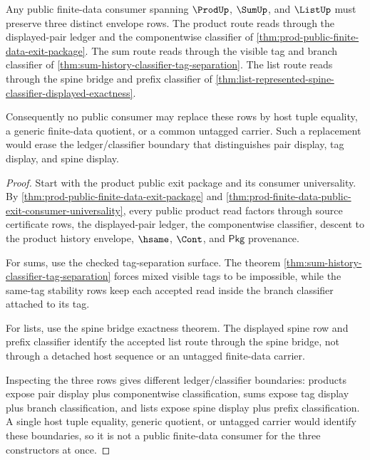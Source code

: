 \begin{theorem}
\label{thm:finite-data-product-sum-list-envelope-separation}
Any public finite-data consumer spanning $\ProdUp$, $\SumUp$, and $\ListUp$
must preserve three distinct envelope rows. The product route reads through the
displayed-pair ledger and the componentwise classifier of
\autoref{thm:prod-public-finite-data-exit-package}. The sum route reads through
the visible tag and branch classifier of
\autoref{thm:sum-history-classifier-tag-separation}. The list route reads
through the spine bridge and prefix classifier of
\autoref{thm:list-represented-spine-classifier-displayed-exactness}.

Consequently no public consumer may replace these rows by host tuple equality,
a generic finite-data quotient, or a common untagged carrier. Such a
replacement would erase the ledger/classifier boundary that distinguishes pair
display, tag display, and spine display.
\end{theorem}
\begin{proof}
Start with the product public exit package and its consumer universality. By
\autoref{thm:prod-public-finite-data-exit-package} and
\autoref{thm:prod-finite-data-public-exit-consumer-universality}, every public
product read factors through source certificate rows, the displayed-pair
ledger, the componentwise classifier, descent to the product history envelope,
$\hsame$, $\Cont$, and $\mathsf{Pkg}$ provenance.

For sums, use the checked tag-separation surface. The theorem
\autoref{thm:sum-history-classifier-tag-separation} forces mixed visible tags
to be impossible, while the same-tag stability rows keep each accepted read
inside the branch classifier attached to its tag.

For lists, use the spine bridge exactness theorem. The displayed spine row and
prefix classifier identify the accepted list route through the spine bridge,
not through a detached host sequence or an untagged finite-data carrier.

Inspecting the three rows gives different ledger/classifier boundaries:
products expose pair display plus componentwise classification, sums expose tag
display plus branch classification, and lists expose spine display plus prefix
classification. A single host tuple equality, generic quotient, or untagged
carrier would identify these boundaries, so it is not a public finite-data
consumer for the three constructors at once.
\end{proof}
